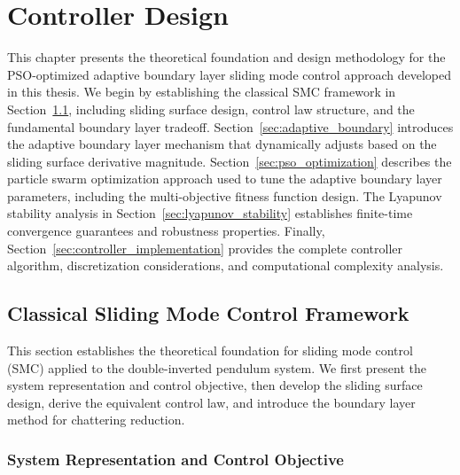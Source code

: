 \chapter{Controller Design}
\label{ch:controller_design}

This chapter presents the theoretical foundation and design methodology for the PSO-optimized adaptive boundary layer sliding mode control approach developed in this thesis. We begin by establishing the classical SMC framework in Section~\ref{sec:classical_smc}, including sliding surface design, control law structure, and the fundamental boundary layer tradeoff. Section~\ref{sec:adaptive_boundary} introduces the adaptive boundary layer mechanism that dynamically adjusts based on the sliding surface derivative magnitude. Section~\ref{sec:pso_optimization} describes the particle swarm optimization approach used to tune the adaptive boundary layer parameters, including the multi-objective fitness function design. The Lyapunov stability analysis in Section~\ref{sec:lyapunov_stability} establishes finite-time convergence guarantees and robustness properties. Finally, Section~\ref{sec:controller_implementation} provides the complete controller algorithm, discretization considerations, and computational complexity analysis.

\section{Classical Sliding Mode Control Framework}
\label{sec:classical_smc}

This section establishes the theoretical foundation for sliding mode control (SMC) applied to the double-inverted pendulum system. We first present the system representation and control objective, then develop the sliding surface design, derive the equivalent control law, and introduce the boundary layer method for chattering reduction.

\subsection{System Representation and Control Objective}
\label{subsec:system_representation}


